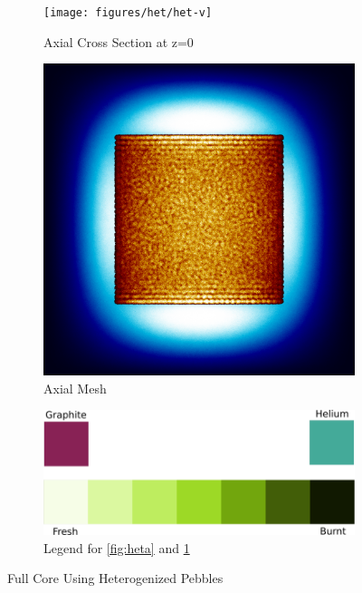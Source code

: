 \begin{figure}[H]
\begin{subfigure}{0.4\textwidth}
  \texttt{[image: figures/het/het-v]}
  \caption{Axial Cross Section at z=0 }
  \label{fig:hetc}
\end{subfigure}
%
\begin{subfigure}{0.4\textwidth}
  \includegraphics[width=0.95\linewidth]{figures/het/het-vm}
  \caption{Axial Mesh}
  \label{fig:hetd}
\end{subfigure}

\begin{subfigure}{\textwidth}
\centering
\includegraphics[width=0.6\linewidth]{figures/geom-legend}
\caption{Legend for \ref{fig:heta} and \ref{fig:hetc}}
\label{fig:geom-legend}
\end{subfigure}
%
\caption{Full Core Using Heterogenized Pebbles}
\label{fig:het}
\end{figure}